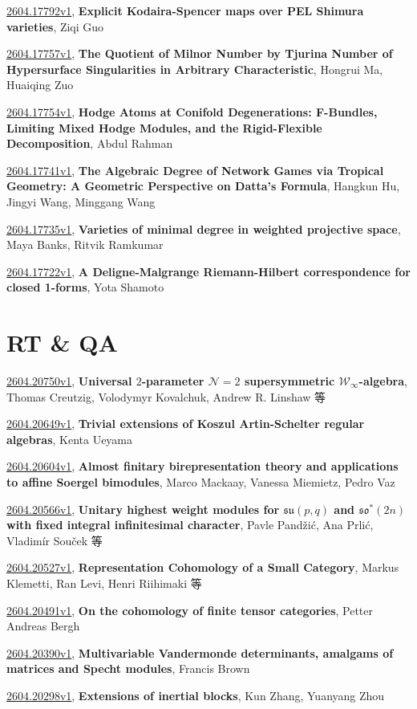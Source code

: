\documentclass[9pt, a4paper]{article}
\theoremstyle{plain}
\theoremstyle{definition}
\theoremstyle{remark}
\newcommand{\arxiv}[3]{\href{https://arxiv.org/abs/#1}{#1}, \textbf{\textcolor{arxivblue}{#2}}, #3}
\begin{document}
\arxiv{2604.17792v1}{Explicit Kodaira-Spencer maps over PEL Shimura varieties}{Ziqi Guo}

\arxiv{2604.17757v1}{The Quotient of Milnor Number by Tjurina Number of Hypersurface Singularities in Arbitrary Characteristic}{Hongrui Ma, Huaiqing Zuo}

\arxiv{2604.17754v1}{Hodge Atoms at Conifold Degenerations: F-Bundles, Limiting Mixed Hodge Modules, and the Rigid-Flexible Decomposition}{Abdul Rahman}

\arxiv{2604.17741v1}{The Algebraic Degree of Network Games via Tropical Geometry: A Geometric Perspective on Datta's Formula}{Hangkun Hu, Jingyi Wang, Minggang Wang}

\arxiv{2604.17735v1}{Varieties of minimal degree in weighted projective space}{Maya Banks, Ritvik Ramkumar}

\arxiv{2604.17722v1}{A Deligne-Malgrange Riemann-Hilbert correspondence for closed 1-forms}{Yota Shamoto}


\section{RT \& QA}
\arxiv{2604.20750v1}{Universal $2$-parameter $\mathcal{N}=2$ supersymmetric $\mathcal{W}_{\infty}$-algebra}{Thomas Creutzig, Volodymyr Kovalchuk, Andrew R. Linshaw 等}

\arxiv{2604.20649v1}{Trivial extensions of Koszul Artin-Schelter regular algebras}{Kenta Ueyama}

\arxiv{2604.20604v1}{Almost finitary birepresentation theory and applications to affine Soergel bimodules}{Marco Mackaay, Vanessa Miemietz, Pedro Vaz}

\arxiv{2604.20566v1}{Unitary highest weight modules for $\mathfrak{su}(p, q)$ and $\mathfrak{so}^{*}(2n)$ with fixed integral infinitesimal character}{Pavle Pandžić, Ana Prlić, Vladimír Souček 等}

\arxiv{2604.20527v1}{Representation Cohomology of a Small Category}{Markus Klemetti, Ran Levi, Henri Riihimaki 等}

\arxiv{2604.20491v1}{On the cohomology of finite tensor categories}{Petter Andreas Bergh}

\arxiv{2604.20390v1}{Multivariable Vandermonde determinants, amalgams of matrices and Specht modules}{Francis Brown}

\arxiv{2604.20298v1}{Extensions of inertial blocks}{Kun Zhang, Yuanyang Zhou}
\end{document}
